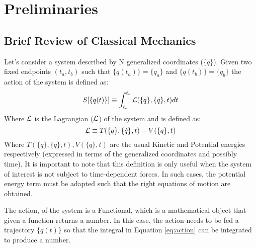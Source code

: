 \pagestyle{plain} 
\setcounter{page}{1}

\chapter{Preliminaries}


\section{Brief Review of Classical Mechanics}
Let's consider a system described by N generalized coordinates ($\{q\}$). Given two fixed endpoints $(t_a,t_b)$ such that $\{q(t_a)\}= \{q_a\}$ and $\{q(t_b)\} = \{q_b\}$ the action of the system is defined as:
\begin{equation}
    S[\{q(t)\}] \equiv \int_{t_a}^{t_b} \mathcal{L}(\{q\},\{\dot q\},t) dt
    \label{eq:action}
\end{equation}
Where $\mathcal{L}$ is the Lagrangian ($\mathcal{L}$) of the system and is defined as:
\begin{equation}
    \mathcal{L} \equiv T(\{q\},\{\dot q\},t) - V(\{q\},t)
\end{equation}
Where $T(\{q\},\{\dot q\},t), V(\{q\},t)$ are the usual Kinetic and Potential energies respectively (expressed in terms of the generalized coordinates and possibly time). It is important to note that this definition is only useful when the system of interest is not subject to time-dependent forces. In such cases, the potential energy term must be adapted such that the right equations of motion are obtained.

\vspace{1mm}\noindent
The action, of the system is a Functional, which is a mathematical object that given a function returns a number. In this case, the action needs to be fed a trajectory $\{q(t)\}$ so that the integral in Equation \ref{eq:action} can be integrated to produce a number.

